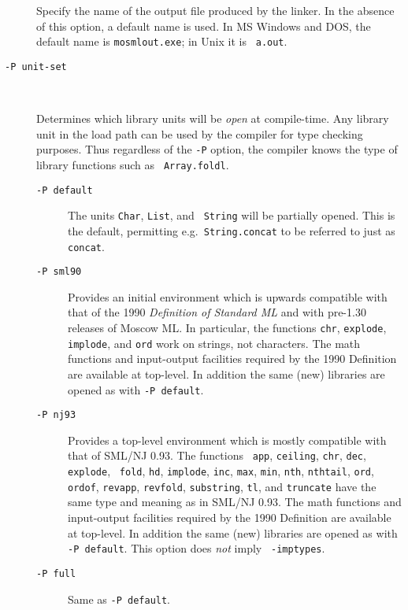 \documentclass[fleqn]{article}
\begin{document}
\begin{description}
  Specify the name of the output file produced by the linker.  In the
  absence of this option, a default name is used.  In MS Windows and
  DOS, the default name is {\tt mosmlout.exe}; in Unix it is {\tt
    a.out}.

\item[{\tt -P {\rm unit-set}}]\mbox{ }

  Determines which library units will be {\em open\/} at compile-time.
  Any library unit in the load path can be used by the compiler for
  type checking purposes.  Thus regardless of the {\tt -P} option, the
  compiler knows the type of library functions such as {\tt
    Array.foldl}.

  \begin{description}
  \item[{\tt -P default}] The units {\tt Char}, {\tt List}, and {\tt
      String} will be partially opened.  This is the default,
    permitting e.g.\ {\tt String.concat} to be referred to just as
    {\tt concat}.

  \item[{\tt -P sml90}] Provides an initial environment which is
    upwards compatible with that of the 1990 {\em Definition of
      Standard ML\/} and with pre-1.30 releases of Moscow ML\@.  In
    particular, the functions {\tt chr}, {\tt explode}, {\tt implode},
    and {\tt ord} work on strings, not characters.  The math functions
    and input-output facilities required by the 1990 Definition
    \cite[Appendix C and D]{Milner:1990:TheDefinition} are available
    at top-level.  In addition the same (new) libraries are opened as
    with {\tt -P default}.

  \item[{\tt -P nj93}] Provides a top-level environment which is
    mostly compatible with that of SML/NJ 0.93.  The functions {\tt
      app}, {\tt ceiling}, {\tt chr}, {\tt dec}, {\tt explode}, {\tt
      fold}, {\tt hd}, {\tt implode}, {\tt inc}, {\tt max}, {\tt min},
    {\tt nth}, {\tt nthtail}, {\tt ord}, {\tt ordof}, {\tt revapp},
    {\tt revfold}, {\tt substring}, {\tt tl}, and {\tt truncate} have
    the same type and meaning as in SML/NJ 0.93.  The math functions
    and input-output facilities required by the 1990 Definition
    \cite[Appendix C and D]{Milner:1990:TheDefinition} are available
    at top-level.  In addition the same (new) libraries are opened as
    with {\tt -P default}.  This option does {\em not\/} imply {\tt
      -imptypes}.

  \item[{\tt -P full}] Same as {\tt -P default}.


\end{description}
\end{description}
\end{document}
